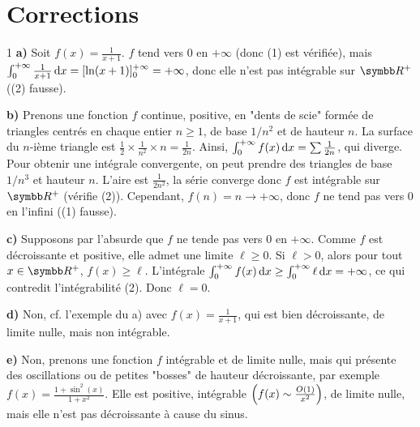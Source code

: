 \section{Corrections}

\begin{correction}{1}
\textbf{a)} Soit $f(x) = \frac{1}{x+1}$. $f$ tend vers 0 en $+\infty$ (donc (1) est vérifiée), mais $\int_0^{+\infty} \frac{1}{x+1}\,\mathrm{d}x = [\ln(x+1)]_0^{+\infty} = +\infty$, donc elle n'est pas intégrable sur $\R^+$ ((2) fausse).

\textbf{b)} Prenons une fonction $f$ continue, positive, en "dents de scie" formée de triangles centrés en chaque entier $n \ge 1$, de base $1/n^2$ et de hauteur $n$. La surface du $n$-ième triangle est $\frac{1}{2} \times \frac{1}{n^2} \times n = \frac{1}{2n}$. Ainsi, $\int_0^{+\infty} f(x)\,\mathrm{d}x = \sum \frac{1}{2n}$, qui diverge. Pour obtenir une intégrale convergente, on peut prendre des triangles de base $1/n^3$ et hauteur $n$. L'aire est $\frac{1}{2n^2}$, la série converge donc $f$ est intégrable sur $\R^+$ (vérifie (2)). Cependant, $f(n)=n \to +\infty$, donc $f$ ne tend pas vers $0$ en l'infini ((1) fausse).

\textbf{c)} Supposons par l'absurde que $f$ ne tende pas vers 0 en $+\infty$. Comme $f$ est décroissante et positive, elle admet une limite $\ell \ge 0$. Si $\ell > 0$, alors pour tout $x \in \R^+$, $f(x) \ge \ell$. L'intégrale $\int_0^{+\infty} f(x)\,\mathrm{d}x \ge \int_0^{+\infty} \ell \,\mathrm{d}x = +\infty$, ce qui contredit l'intégrabilité (2). Donc $\ell = 0$.

\textbf{d)} Non, cf. l'exemple du a) avec $f(x) = \frac{1}{x+1}$, qui est bien décroissante, de limite nulle, mais non intégrable.

\textbf{e)} Non, prenons une fonction $f$ intégrable et de limite nulle, mais qui présente des oscillations ou de petites "bosses" de hauteur décroissante, par exemple $f(x) = \frac{1+\sin^2(x)}{1+x^2}$. Elle est positive, intégrable $\left(f(x) \sim \frac{O(1)}{x^2}\right)$, de limite nulle, mais elle n'est pas décroissante à cause du sinus.
\end{correction}

